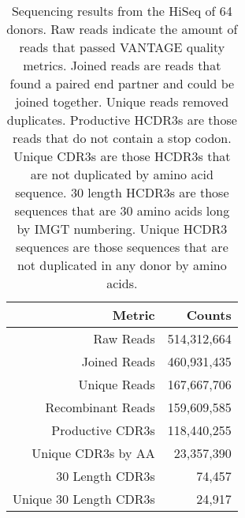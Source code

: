 \begin{SCtable}
\centering
\begin{tabular}{rr}
\toprule
\textbf{Metric}        & \textbf{Counts} \\
\midrule
Raw Reads              & 514,312,664     \\
Joined Reads           & 460,931,435     \\
Unique Reads           & 167,667,706     \\
Recombinant Reads      & 159,609,585     \\
Productive CDR3s       & 118,440,255     \\
Unique CDR3s by AA     & 23,357,390      \\
30 Length CDR3s        & 74,457          \\
Unique 30 Length CDR3s & 24,917         \\
\bottomrule
\end{tabular}
\caption[HiSeq 64-Donor Statistics]{Sequencing results from the HiSeq of 64 donors. Raw reads indicate the amount of reads that passed VANTAGE quality metrics. Joined reads are reads that found a paired end partner and could be joined together. Unique reads removed duplicates. Productive HCDR3s are those reads that do not contain a stop codon. Unique CDR3s are those HCDR3s that are not duplicated by amino acid sequence. 30 length HCDR3s are those sequences that are 30 amino acids long by IMGT numbering. Unique HCDR3 sequences are those sequences that are not duplicated in any donor by amino acids.}
\label{tab:table3_2}
\end{SCtable}